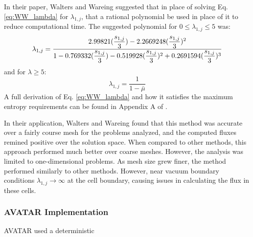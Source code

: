 In their paper, Walters and Wareing \cite{walters_accurate_1996} suggested that in place of
solving Eq. \eqref{eq:WW_lambda} for $\lambda_{1,j}$, that a rational polynomial
be used in place of it to reduce computational time. The
suggested polynomial for $0 \leq \lambda_{1,j} \leq 5$ was:
\newcommand{\lamvar}{\dfrac{s_{1,j}}{3}}
\begin{equation}
  \lambda_{1,j} =  \dfrac{2.99821 (\lamvar) - 2.2669248 (\lamvar)^2 }{1 - 0.769332
             (\lamvar) -0.519928 (\lamvar)^2 + 0.2691594 (\lamvar)^3} \\
\end{equation}
and for $\lambda \geq 5$:
\begin{equation}
  \lambda_{1,j} = \frac{1}{1-\bar\mu}
\end{equation}
A full derivation of Eq. \eqref{eq:WW_lambda} and how it satisfies the maximum
entropy requirements can be found in Appendix A of \cite{walters_accurate_1996}.

In their application, Walters and Wareing found that this method was accurate
over a fairly course mesh for the problems analyzed, and the computed fluxes
remined positive over the solution space. When compared to other methods, this
approach performed much better over coarse meshes. However, the analysis was
limited to one-dimensional problems. As mesh size grew finer, the method
performed similarly to other methods. However, near vacuum boundary conditions
$\lambda_{1,j} \rightarrow \infty$ at the cell boundary, causing issues in
calculating the flux in these cells.

\subsubsection*{AVATAR Implementation}

AVATAR used a deterministic

